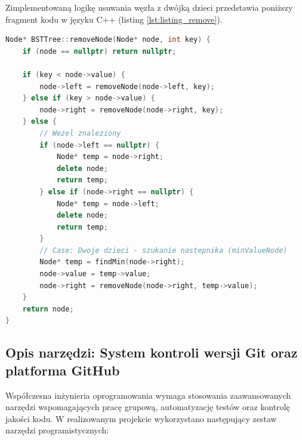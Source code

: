 \hspace{0.60cm}
Zimplementowaną logikę usuwania węzła z dwójką dzieci przedstawia poniższy fragment kodu w języku C++ (listing \ref{lst:listing_remove}).

\begin{lstlisting}[caption=Algorytm usuwania węzła z dwójką dzieci w klasie BSTTree, label={lst:listing_remove}, language=C++]
Node* BSTTree::removeNode(Node* node, int key) {
    if (node == nullptr) return nullptr;

    if (key < node->value) {
        node->left = removeNode(node->left, key);
    } else if (key > node->value) {
        node->right = removeNode(node->right, key);
    } else {
        // Wezel znaleziony
        if (node->left == nullptr) {
            Node* temp = node->right;
            delete node;
            return temp;
        } else if (node->right == nullptr) {
            Node* temp = node->left;
            delete node;
            return temp;
        }
        // Case: Dwoje dzieci - szukanie nastepnika (minValueNode)
        Node* temp = findMin(node->right);
        node->value = temp->value;
        node->right = removeNode(node->right, temp->value);
    }
    return node;
}
\end{lstlisting}

\subsection{Opis narzędzi: System kontroli wersji Git oraz platforma GitHub}

\hspace{0.60cm}
Współczesna inżynieria oprogramowania wymaga stosowania zaawansowanych narzędzi wspomagających pracę grupową, automatyzację testów oraz kontrolę jakości kodu. W realizowanym projekcie wykorzystano następujący zestaw narzędzi programistycznych:

